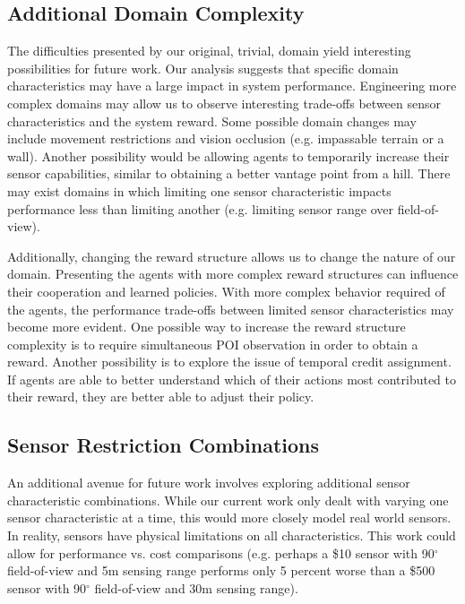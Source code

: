 \documentclass[letterpaper, 10 pt, conference]{ieeeconf}  %
\begin{document}
\subsection{Additional Domain Complexity}
The difficulties presented by our original, trivial, domain yield interesting possibilities for future work. Our analysis suggests that specific domain characteristics may have a large impact in system performance. Engineering more complex domains may allow us to observe interesting trade-offs between sensor characteristics and the system reward. Some possible domain changes may include movement restrictions and vision occlusion (e.g. impassable terrain or a wall). Another possibility would be allowing agents to temporarily increase their sensor capabilities, similar to obtaining a better vantage point from a hill. There may exist domains in which limiting one sensor characteristic impacts performance less than limiting another (e.g. limiting sensor range over field-of-view).

Additionally, changing the reward structure allows us to change the nature of our domain. Presenting the agents with more complex reward structures can influence their cooperation and learned policies. With more complex behavior required of the agents, the performance trade-offs between limited sensor characteristics may become more evident. One possible way to increase the reward structure complexity is to require simultaneous POI observation in order to obtain a reward. Another possibility is to explore the issue of temporal credit assignment. If agents are able to better understand which of their actions most contributed to their reward, they are better able to adjust their policy.

\subsection{Sensor Restriction Combinations}
An additional avenue for future work involves exploring additional sensor characteristic combinations. While our current work only dealt with varying one sensor characteristic at a time, this would more closely model real world sensors. In reality, sensors have physical limitations on all characteristics. This work could allow for performance vs. cost comparisons (e.g. perhaps a \$10 sensor with 90$^{\circ}$ field-of-view and 5m sensing range performs only 5 percent worse than a \$500 sensor with 90$^{\circ}$ field-of-view and 30m sensing range).
\end{document}
